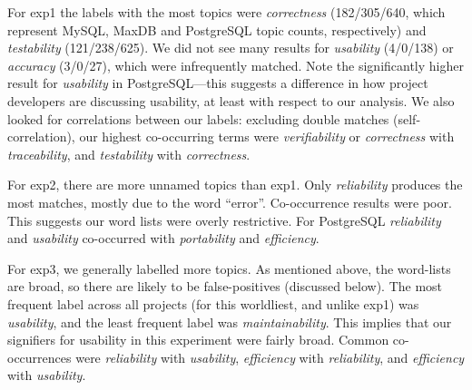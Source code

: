 \documentclass[smallextended]{svjour3}       %
\begin{document}
\begin{table}
\end{table}

For \textsf{exp1} the labels with the most topics
were
\emph{correctness} (182/305/640, which represent MySQL, MaxDB and PostgreSQL topic counts, respectively) and \emph{testability} (121/238/625). 
We did not see many results for \emph{usability} (4/0/138) or
\emph{accuracy} (3/0/27), which were infrequently matched. Note the significantly higher result for \emph{usability} in PostgreSQL---this suggests a difference in how project developers are discussing usability, at least with respect to our analysis.
We also looked for correlations between our labels: excluding double
matches (self-correlation), our highest co-occurring terms were
\emph{verifiability} or \emph{correctness}
with \emph{traceability}, and \emph{testability} with \emph{correctness}.%

For \textsf{exp2}, there are more unnamed topics than \textsf{exp1}. 
Only \emph{reliability} produces the most matches, mostly due to the word ``error''. 
Co-occurrence results were poor. This suggests our word lists were overly restrictive.
For PostgreSQL \emph{reliability} and  \emph{usability} co-occurred
with \emph{portability} and \emph{efficiency}.


For \textsf{exp3}, we generally labelled more topics. 
As mentioned above, the word-lists are broad, so there are likely to be false-positives (discussed below). 
The most frequent label across all projects (for this worldliest, and unlike \textsf{exp1}) was \emph{usability}, and the
least frequent label was \emph{maintainability}. This implies that our signifiers for usability in this experiment were fairly broad.
Common co-occurrences were \emph{reliability} with \emph{usability}, \emph{efficiency} with \emph{reliability}, and \emph{efficiency} with \emph{usability}.
\end{document}
